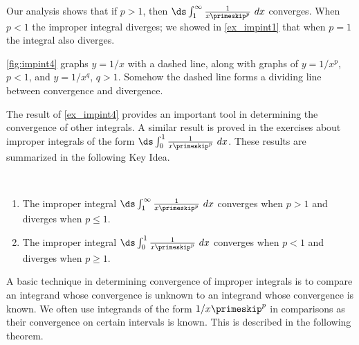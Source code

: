 \begin{example}
Our analysis shows that if $p>1$, then $\ds\int_1^\infty \frac1{x\primeskip^p}\ dx $ converges. When $p<1$ the improper integral diverges; we showed in \autoref{ex_impint1} that when $p=1$ the integral also diverges. 

\autoref{fig:impint4} graphs $y=1/x$ with a dashed line, along with graphs of $y=1/x^p$, $p<1$, and $y=1/x^q$, $q>1$. Somehow the dashed line forms a dividing line between convergence and divergence. %
\end{example}

The result of \autoref{ex_impint4} provides an important tool in determining the convergence of other integrals. A similar result is proved in the exercises about improper integrals of the form $\ds \int_0^1\frac1{x\primeskip^p}\ dx$. These results are summarized in the following Key Idea.

{
\begin{keyidea}\label{idea:impint1}
\mbox{}\\[-1.5\baselineskip]\parbox[t]{\linewidth}{%
\begin{enumerate}
\item		The improper integral $\ds \int_1^\infty\frac1{x\primeskip^p}\ dx$ converges when $p>1$ and diverges when $p\leq 1.$
\item		The improper integral $\ds \int_0^1\frac1{x\primeskip^p}\ dx$ converges when $p<1$ and diverges when $p\geq 1.$
\end{enumerate}}
\end{keyidea}}

A basic technique in determining convergence of improper integrals is to compare an integrand whose convergence is unknown to an integrand whose convergence is known. We often use integrands of the form $1/x\primeskip^p$ in comparisons as their convergence on certain intervals is known. This is described in the following theorem.


